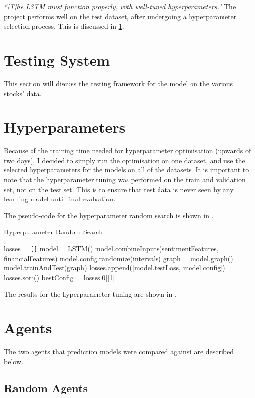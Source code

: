 \documentclass[12pt,a4paper,twoside,openright]{report}
\begin{document}
\textit{``[T]he LSTM must function properly, with well-tuned hyperparameters."}
The project performs well on the test dataset, after undergoing a hyperparameter selection process.
This is discussed in \cref{sec:evalTesting}.

\section{Testing System}
\label{sec:evalTesting}

This section will discuss the testing framework for the model on the various stocks' data.

\section{Hyperparameters}
Because of the training time needed for hyperparameter optimisation (upwards of two days),
I decided to simply run the optimisation on one dataset, and use the selected hyperparameters
for the models on all of the datasets. It is important to note that the
hyperparameter tuning was performed on the train and validation set, not on the test set.
This is to ensure that test data is never seen by any learning model until final evaluation.

The pseudo-code for the hyperparameter random search is shown in .

\begin{algorithm}[H]
\caption{Hyperparameter Random Search}\label{alg:LSTMhyper}
\begin{algorithmic}
\State losses = \texttt{[]}
	\State model = LSTM()
	\State model.combineInputs(sentimentFeatures, financialFeatures)
	\State model.config.randomize(intervals)
	\State graph = model.graph()
	\State model.trainAndTest(graph)
	\State losses.append([model.testLoss, model.config])
\EndFor
\State losses.sort()
\State bestConfig = losses[0][1]
\end{algorithmic}
\end{algorithm}

The results for the hyperparameter tuning are shown in .

\section{Agents}
The two agents that prediction models were compared against are described below.

\subsection{Random Agents}
\end{document}
